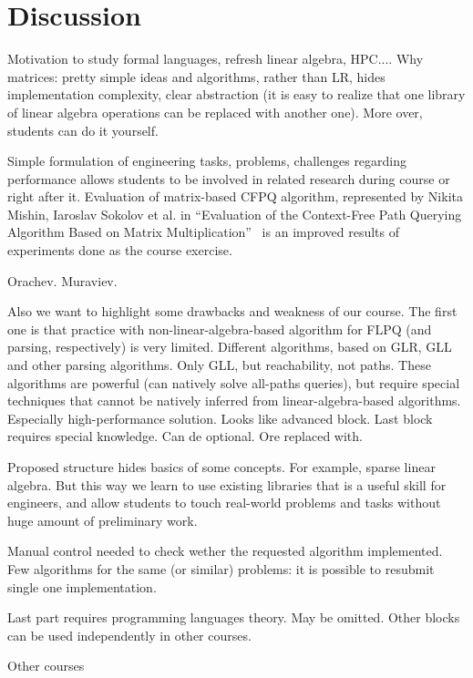 \documentclass[sigconf]{acmart}
\begin{document}
\section{Discussion}

Motivation to study formal languages, refresh linear algebra, HPC....
Why matrices: pretty simple ideas and algorithms, rather than LR, hides implementation complexity, clear abstraction (it is easy to realize that one library of linear algebra operations can be replaced with another one). More over, students can do it yourself.

Simple formulation of engineering tasks, problems, challenges regarding performance allows students to be involved in related research during course or right after it. 
Evaluation of matrix-based CFPQ algorithm, represented by Nikita Mishin, Iaroslav Sokolov et al. in ``Evaluation of the Context-Free Path Querying Algorithm Based on Matrix Multiplication''~\cite{10.1145/3327964.3328503} is an improved results of experiments done as the course exercise. 

Orachev.
Muraviev.

Also we want to highlight some drawbacks and weakness of our course.
The first one is that practice with non-linear-algebra-based algorithm for FLPQ (and parsing, respectively) is very limited. 
Different algorithms, based on GLR, GLL and other parsing algorithms. 
Only GLL, but reachability, not paths.
These algorithms are powerful (can natively solve all-paths queries), but require special techniques that cannot be natively inferred from linear-algebra-based algorithms.
Especially high-performance solution.
Looks like advanced block. 
Last block requires special knowledge. 
Can de optional. 
Ore replaced with.

Proposed structure hides basics of some concepts. 
For example, sparse linear algebra.
But this way we learn to use existing libraries that is a useful skill for engineers, and allow students to touch real-world problems and tasks without huge amount of preliminary work.

Manual control needed to check wether the requested algorithm implemented.
Few algorithms for the same (or similar) problems: it is possible to resubmit single one implementation.

Last part requires programming languages theory. May be omitted. Other blocks can be used independently in other courses.

Other courses ~\cite{Figueira2022}
\end{document}
